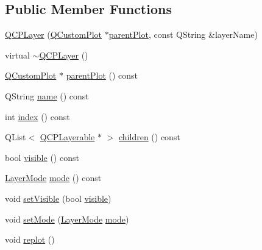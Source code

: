 \subsection*{Public Member Functions}
\begin{DoxyCompactItemize}
\item 
\mbox{\hyperlink{class_q_c_p_layer_a5d0657fc86d624e5efbe930ef21af718}{Q\+C\+P\+Layer}} (\mbox{\hyperlink{class_q_custom_plot}{Q\+Custom\+Plot}} $\ast$\mbox{\hyperlink{class_q_c_p_layer_a5520019787482e13857ebe631c27c3fa}{parent\+Plot}}, const Q\+String \&layer\+Name)
\item 
virtual \mbox{\hyperlink{class_q_c_p_layer_afc1a8940f8e34c9f25ead9dfd4828cae}{$\sim$\+Q\+C\+P\+Layer}} ()
\item 
\mbox{\hyperlink{class_q_custom_plot}{Q\+Custom\+Plot}} $\ast$ \mbox{\hyperlink{class_q_c_p_layer_a5520019787482e13857ebe631c27c3fa}{parent\+Plot}} () const
\item 
Q\+String \mbox{\hyperlink{class_q_c_p_layer_a37806f662b50b588fb1029a14fc5ef50}{name}} () const
\item 
int \mbox{\hyperlink{class_q_c_p_layer_ad322905c4700dcc7ceba63e011c730d2}{index}} () const
\item 
Q\+List$<$ \mbox{\hyperlink{class_q_c_p_layerable}{Q\+C\+P\+Layerable}} $\ast$ $>$ \mbox{\hyperlink{class_q_c_p_layer_a183b90941fc78f0b136edd77c5fb6966}{children}} () const
\item 
bool \mbox{\hyperlink{class_q_c_p_layer_ad1cc2d6b32d2abb33c7f449b964e068c}{visible}} () const
\item 
\mbox{\hyperlink{class_q_c_p_layer_a67dcfc1590be2a1f2227c5a39bb59c7c}{Layer\+Mode}} \mbox{\hyperlink{class_q_c_p_layer_a44ae50b011b19f3dd46a38d8e2e2c1b6}{mode}} () const
\item 
void \mbox{\hyperlink{class_q_c_p_layer_ac07671f74edf6884b51a82afb2c19516}{set\+Visible}} (bool \mbox{\hyperlink{class_q_c_p_layer_ad1cc2d6b32d2abb33c7f449b964e068c}{visible}})
\item 
void \mbox{\hyperlink{class_q_c_p_layer_a938d57b04f4e4c23cedf1711f983919b}{set\+Mode}} (\mbox{\hyperlink{class_q_c_p_layer_a67dcfc1590be2a1f2227c5a39bb59c7c}{Layer\+Mode}} \mbox{\hyperlink{class_q_c_p_layer_a44ae50b011b19f3dd46a38d8e2e2c1b6}{mode}})
\item 
void \mbox{\hyperlink{class_q_c_p_layer_adefd53b6db02f470151c416f42e37180}{replot}} ()
\end{DoxyCompactItemize}
